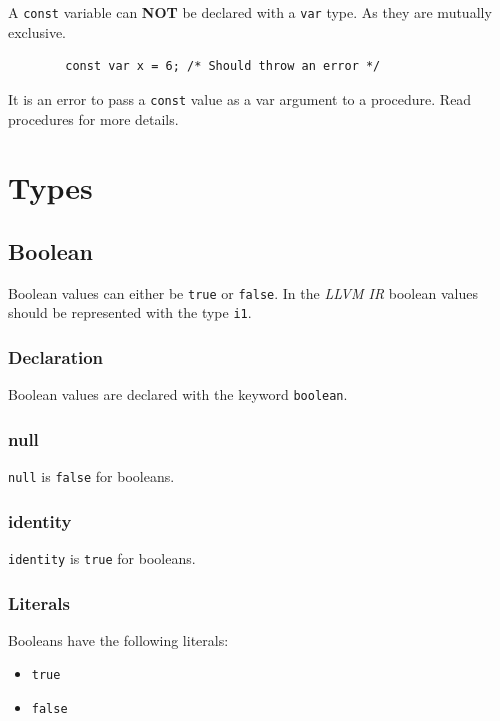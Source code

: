 \documentclass{article}
\begin{document}
	A \texttt{const} variable can \textbf{NOT} be declared with a \texttt{var} type. As they are mutually exclusive.

	\begin{lstlisting}
		const var x = 6; /* Should throw an error */
	\end{lstlisting}

	It is an error to pass a \texttt{const} value as a var argument to a procedure.  Read procedures for more details.


\section{Types}\label{sec:types}
	\subsection{Boolean}\label{sec:boolean}

		Boolean values can either be \texttt{true} or \texttt{false}. In the \textit{LLVM IR} boolean values should be
		represented with the type \texttt{i1}.

	\subsubsection{Declaration}

		Boolean values are declared with the keyword \texttt{boolean}.

	\subsubsection{null}

		\texttt{null} is \texttt{false} for booleans.

	\subsubsection{identity}

		\texttt{identity} is \texttt{true} for booleans.

	\subsubsection{Literals}

		Booleans have the following literals:

		\begin{itemize}
			\item \texttt{true}
			\item \texttt{false}
		\end{itemize}
\end{document}
